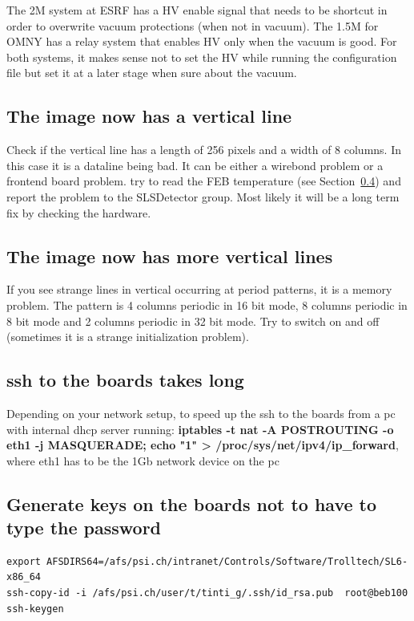 \documentclass{article}
\begin{document}
{{{The 2M system at ESRF has a HV enable signal that needs to be shortcut in order to overwrite vacuum protections (when not in vacuum). 
The 1.5M for OMNY has a relay system that enables HV only when the vacuum is good. 
For both systems, it makes sense not to set the HV while running the configuration file but set it at a later stage when sure about the vacuum. 

\subsection{The image now has a vertical line}
Check if the vertical line has a length of 256 pixels and a width of 8 columns. In this case it is a dataline being bad. It can be either a wirebond problem or a frontend board problem. try to read the FEB temperature (see Section~\ref{}) and report the problem to the SLSDetector group. Most likely it will be a long term fix by checking the hardware.

\subsection{The image now has more vertical lines}

If you see strange lines in vertical occurring at period patterns, it is a memory problem. The pattern is 4 columns periodic in 16 bit mode, 8 columns periodic in 8 bit mode and 2 columns periodic in 32 bit mode. Try to switch on and off (sometimes it is a strange initialization problem).

\subsection{ssh to the boards takes long}
Depending on your network setup,  to speed up the ssh to the boards from a pc with internal dhcp server running: \textbf{iptables -t nat -A POSTROUTING -o eth1 -j MASQUERADE; echo "1" > /proc/sys/net/ipv4/ip\_forward}, where eth1 has to be the 1Gb network device on the pc

\subsection{Generate keys on the boards not to have to type the password}
\begin{verbatim}
export AFSDIRS64=/afs/psi.ch/intranet/Controls/Software/Trolltech/SL6-x86_64
ssh-copy-id -i /afs/psi.ch/user/t/tinti_g/.ssh/id_rsa.pub  root@beb100
ssh-keygen
\end{verbatim}

}}}
\end{document}
